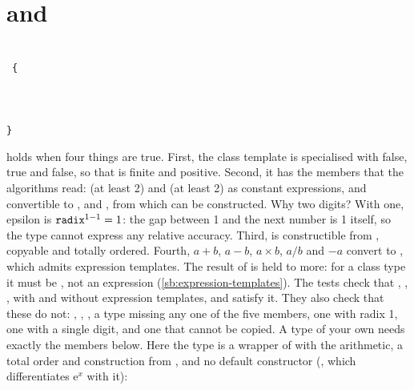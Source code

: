 \section{\texorpdfstring{}{nxx::real} and \texorpdfstring{}{nxx::math}}\label{sec:api-real}

\begin{signature}
\\[1ex]
~\texttt{\{}\\
\sigindent{}\\
\sigindent{}\\
\sigindent{}\\
\texttt{\}}
\end{signature}
 holds when four things are true. First, the class template  is
specialised with  false,  true and  false, so that  is finite and
 positive. Second, it has the members that the algorithms read:  (at least 2) and
 (at least 2) as constant expressions,  and  convertible to , and
, from which  can be constructed. Why two digits? With one, epsilon is
$\code{radix}^{1 - 1} = 1$: the gap between 1 and the next number is 1 itself, so the type cannot express any relative
accuracy. Third,  is constructible from , copyable and totally ordered. Fourth, $a + b$, $a - b$,
$a \times b$, $a / b$ and $-a$ convert to , which admits expression templates. The result of  is
held to more: for a class type it must be , not an expression (\cref{sb:expression-templates}). The tests
check that , , ,  with and without expression
templates, and  satisfy it. They also check that these do not: , ,
, a type missing any one of the five members, one with radix 1, one with a single digit, and one
that cannot be copied. A type of your own needs exactly the
members below. Here the type is a wrapper of  with the arithmetic, a total order and construction from
, and no default constructor (, which differentiates $\mathrm{e}^x$ with
it):

